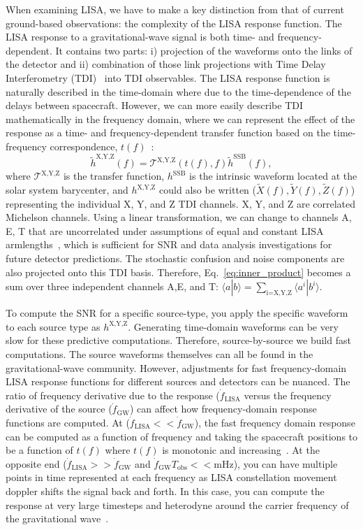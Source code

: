 When examining LISA, we have to make a key distinction from that of current ground-based observations: the complexity of the LISA response function. The LISA response to a gravitational-wave signal is both time- and frequency-dependent. It contains two parts: i) projection of the waveforms onto the links of the detector and ii) combination of those link projections with Time Delay Interferometry (TDI)~\cite{Tinto:2020fcc} into TDI observables. The LISA response function is naturally described in the time-domain where due to the time-dependence of the delays between spacecraft. However, we can more easily describe TDI mathematically in the frequency domain, where we can represent the effect of the response as a time- and frequency-dependent transfer function based on the time-frequency correspondence, $t(f)$~\cite{Marsat:2018oam}:
\begin{equation}
    \tilde{h}^\text{X,Y,Z}(f)=\mathcal{T}^\text{X,Y,Z}(t(f), f)\tilde{h}^\text{SSB}(f),
\end{equation}
where $\mathcal{T}^\text{X,Y,Z}$ is the transfer function, $h^\text{SSB}$ is the intrinsic waveform located at the solar system barycenter, and  $h^\text{X,Y,Z}$ could also be written ($\tilde{X}(f), \tilde{Y}(f), \tilde{Z}(f)$) representing the individual X, Y, and Z TDI channels. X, Y, and Z are correlated Michelson channels. Using a linear transformation, we can change to channels A, E, T that are uncorrelated under assumptions of equal and constant LISA armlengths~\cite{Prince:2002hp}, which is sufficient for SNR and data analysis investigations for future detector predictions. The stochastic confusion and noise components are also projected onto this TDI basis. Therefore, Eq.~\ref{eq:inner_product} becomes a sum over three independent channels A,E, and T: $\langle a|b\rangle=\sum_\text{i=X,Y,Z}\langle a^i|b^i\rangle$. 

To compute the SNR for a specific source-type, you apply the specific waveform to each source type as $h^\text{X,Y,Z}$. Generating time-domain waveforms can be very slow for these predictive computations. Therefore, source-by-source we build fast computations. The source waveforms themselves can all be found in the gravitational-wave community. However, adjustments for fast frequency-domain LISA response functions for different sources and detectors can be nuanced. The ratio of frequency derivative due to the response ($\dot{f}_\text{LISA}$ versus the frequency derivative of the source ($\dot{f}_\text{GW}$) can affect how frequency-domain response functions are computed. At ($\dot{f}_\text{LISA}<<\dot{f}_\text{GW}$), the fast frequency domain response can be computed as a function of frequency and taking the spacecraft positions to be a function of $t(f)$ where $t(f)$ is monotonic and increasing~\cite{Marsat:2020rtl,Katz:2022yqe}. At the opposite end ($\dot{f}_\text{LISA}>>\dot{f}_\text{GW}$ and $\dot{f}_\text{GW}T_\text{obs} << \text{mHz}$), you can have multiple points in time represented at each frequency as LISA constellation movement doppler shifts the signal back and forth. In this case, you can compute the response at very large timesteps and heterodyne around the carrier frequency of the gravitational wave~\cite{Cornish:2007if}.
